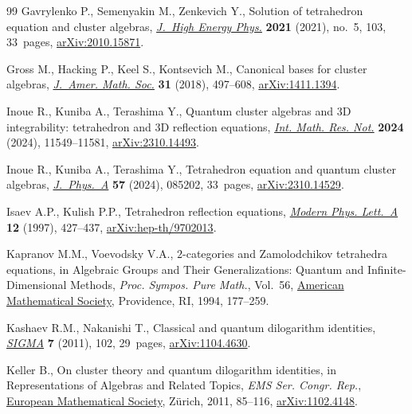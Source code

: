 \documentclass[pdftex]{sigma}
\numberwithin{equation}{section}
\begin{document}
\begin{thebibliography}{99}
Gavrylenko P., Semenyakin M., Zenkevich Y., Solution of tetrahedron equation
 and cluster algebras, \href{https://doi.org/10.1007/jhep05(2021)103}{\textit{J.~High Energy Phys.}} \textbf{2021} (2021),
 no.~5, 103, 33~pages, \href{https://arxiv.org/abs/2010.15871}{arXiv:2010.15871}.

Gross M., Hacking P., Keel S., Kontsevich M., Canonical bases for cluster
 algebras, \href{https://doi.org/10.1090/jams/890}{\textit{J.~Amer. Math. Soc.}} \textbf{31} (2018), 497--608,
 \href{https://arxiv.org/abs/1411.1394}{arXiv:1411.1394}.

Inoue R., Kuniba A., Terashima Y., Quantum cluster algebras and 3{D}
 integrability: tetrahedron and 3{D} reflection equations, \href{https://doi.org/10.1093/imrn/rnae128}{\textit{Int. Math.
 Res. Not.}} \textbf{2024} (2024), 11549--11581, \href{https://arxiv.org/abs/2310.14493}{arXiv:2310.14493}.

Inoue R., Kuniba A., Terashima Y., Tetrahedron equation and quantum cluster
 algebras, \href{https://doi.org/10.1088/1751-8121/ad2224}{\textit{J.~Phys.~A}} \textbf{57} (2024), 085202, 33~pages,
 \href{https://arxiv.org/abs/2310.14529}{arXiv:2310.14529}.

Isaev A.P., Kulish P.P., Tetrahedron reflection equations, \href{https://doi.org/10.1142/S0217732397000443}{\textit{Modern Phys.
 Lett.~A}} \textbf{12} (1997), 427--437, \href{https://arxiv.org/abs/hep-th/9702013}{arXiv:hep-th/9702013}.

Kapranov M.M., Voevodsky V.A., {$2$}-categories and {Z}amolodchikov tetrahedra
 equations, in Algebraic {G}roups and {T}heir {G}eneralizations: {Q}uantum and
 {I}nfinite-{D}imensional {M}ethods, \textit{Proc. Sympos. Pure Math.},
 Vol.~56, \href{https://doi.org/10.1090/pspum/056.2/1278735}{American Mathematical Society}, Providence, RI, 1994, 177--259.

Kashaev R.M., Nakanishi T., Classical and quantum dilogarithm identities,
 \href{https://doi.org/10.3842/SIGMA.2011.102}{\textit{SIGMA}} \textbf{7} (2011), 102, 29~pages, \href{https://arxiv.org/abs/1104.4630}{arXiv:1104.4630}.

Keller B., On cluster theory and quantum dilogarithm identities, in
 Representations of {A}lgebras and {R}elated {T}opics, \textit{EMS Ser. Congr. Rep.},
 \href{https://doi.org/10.4171/101-1/3}{European Mathematical Society}, Z\"urich, 2011, 85--116, \href{https://arxiv.org/abs/1102.4148}{arXiv:1102.4148}.


\end{thebibliography}
\end{document}
